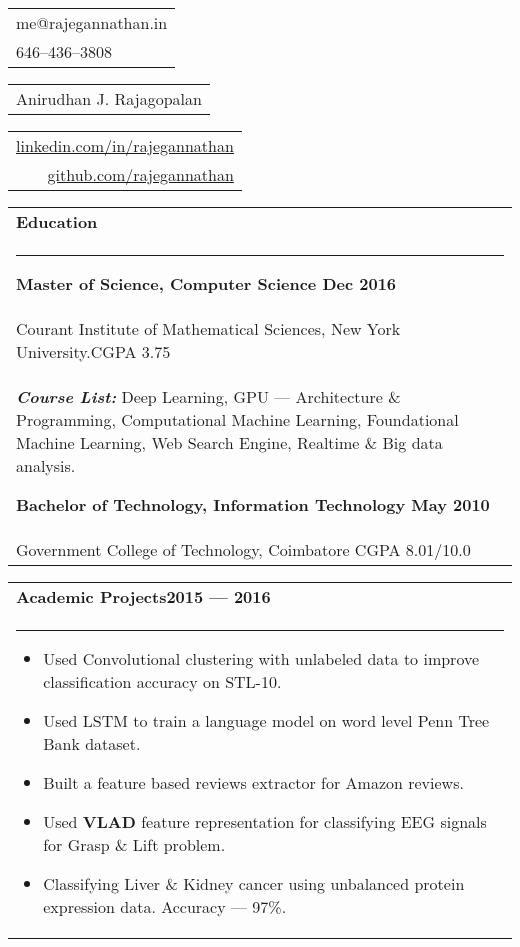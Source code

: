 \documentclass{article}
\begin{document}
{\small\begin{tabular}[c]{l}
        me@rajegannathan.in \\
        646--436--3808
\end{tabular}}\hfill%
{\Large\bfseries\begin{tabular}[c]{c}
        Anirudhan J. Rajagopalan
\end{tabular}}\hfill%
{\small\begin{tabular}[c]{r}
        \href{https://linkedin.com/in/rajegannathan}{linkedin.com/in/rajegannathan} \\
        \href{https://github.com/rajegannathan}{github.com/rajegannathan}
\end{tabular}}%


\bigskip

\begin{tabular}{p{\dimexpr\linewidth-2\tabcolsep}}
    \textbf{\large{Education}} \\
    \noindent\rule{\textwidth}{0.4pt}
    {\bfseries Master of Science, Computer Science \hfill Dec 2016} \\
    \quad Courant Institute of Mathematical Sciences, New York University.\hfill CGPA 3.75\\
    \quad \textbf{\textit{Course List:}} Deep Learning, GPU --- Architecture \& Programming, Computational Machine Learning, Foundational Machine Learning, Web Search Engine, Realtime \& Big data analysis.

    \bigskip
    {\bfseries Bachelor of Technology, Information Technology \hfill May 2010} \\
    \quad Government College of Technology, Coimbatore \hfill CGPA 8.01/10.0
\end{tabular}

\bigskip

\begin{tabular}{p{\dimexpr\linewidth-2\tabcolsep}}
    \bfseries \large{Academic Projects}\hfill 2015 --- 2016 \mdseries \\
    \noindent\rule{\textwidth}{0.4pt}
    \begin{itemize}
        \item Used Convolutional clustering with unlabeled data to improve classification accuracy on STL-10.
        \item Used LSTM to train a language model on word level Penn Tree Bank dataset.
        \item Built a feature based reviews extractor for Amazon reviews.
        \item Used \textbf{VLAD} feature representation for classifying EEG signals for Grasp \& Lift problem.
        \item Classifying Liver \& Kidney cancer using unbalanced protein expression data. Accuracy --- 97\%.
    \end{itemize}
\end{tabular}
\end{document}
